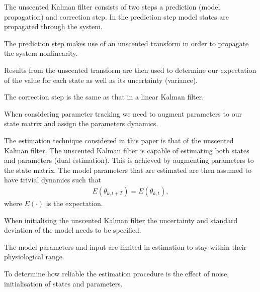 The unscented Kalman filter consists of two steps a prediction (model propagation) and correction step. In the prediction step model states are propagated through the system.

The prediction step makes use of an unscented transform in order to propagate the system nonlinearity.

Results from the unscented transform are then used to determine our expectation of the value for each state as well as its uncertainty (variance).

The correction step is the same as that in a linear Kalman filter.

When considering parameter tracking we need to augment parameters to our state matrix and assign the parameters dynamics.

The estimation technique considered in this paper is that of the unscented Kalman filter. The unscented Kalman filter is capable of estimating both states and parameters (dual estimation). This is achieved by augmenting parameters to the state matrix. The model parameters that are estimated are then assumed to have trivial dynamics such that \begin{align}
E(\theta_{k,t+T}) = E(\theta_{k,t}),
\end{align} where $E(\cdot)$ is the expectation.

When initialising the unscented Kalman filter the uncertainty and standard deviation of the model needs to be specified.

The model parameters and input are limited in estimation to stay within their physiological range.

To determine how reliable the estimation procedure is the effect of noise, initialisation of states and parameters.





